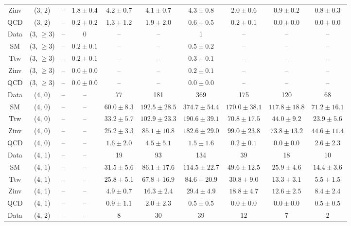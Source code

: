 \begin{table}[h!]
{\begin{tabular}{cccccccccc}
	Zinv & (3, 2) & -- & $1.8\pm 0.4$ & $4.2\pm 0.7$ & $4.1\pm 0.7$ & $4.3\pm 0.8$ & $2.0\pm 0.6$ & $0.9\pm 0.2$ & $0.8\pm 0.3$ \\[0.5ex] 
	QCD & (3, 2) & -- & $0.2\pm 0.2$ & $1.3\pm 1.2$ & $1.9\pm 2.0$ & $0.6\pm 0.5$ & $0.2\pm 0.1$ & $0.0\pm 0.0$ & $0.0\pm 0.0$ \\[0.5ex] 
	Data & (3, $\ge3$) & -- & 0 & -- & -- & 1 & -- & -- & -- \\[0.5ex] 
	SM & (3, $\ge3$) & -- & $0.2\pm 0.1$ & -- & -- & $0.5\pm 0.2$ & -- & -- & -- \\[0.5ex] 
	Ttw & (3, $\ge3$) & -- & $0.2\pm 0.1$ & -- & -- & $0.3\pm 0.1$ & -- & -- & -- \\[0.5ex] 
	Zinv & (3, $\ge3$) & -- & $0.0\pm 0.0$ & -- & -- & $0.2\pm 0.1$ & -- & -- & -- \\[0.5ex] 
	QCD & (3, $\ge3$) & -- & $0.0\pm 0.0$ & -- & -- & $0.0\pm 0.0$ & -- & -- & -- \\[0.5ex] 
	Data & (4, 0) & -- & -- & 77 & 181 & 369 & 175 & 120 & 68 \\[0.5ex] 
	SM & (4, 0) & -- & -- & $60.0\pm 8.3$ & $192.5\pm 28.5$ & $374.7\pm 54.4$ & $170.0\pm 38.1$ & $117.8\pm 18.8$ & $71.2\pm 16.1$ \\[0.5ex] 
	Ttw & (4, 0) & -- & -- & $33.2\pm 5.7$ & $102.9\pm 23.3$ & $190.6\pm 39.1$ & $70.8\pm 17.5$ & $44.0\pm 9.2$ & $23.9\pm 5.6$ \\[0.5ex] 
	Zinv & (4, 0) & -- & -- & $25.2\pm 3.3$ & $85.1\pm 10.8$ & $182.6\pm 29.0$ & $99.0\pm 23.8$ & $73.8\pm 13.2$ & $44.6\pm 11.4$ \\[0.5ex] 
	QCD & (4, 0) & -- & -- & $1.6\pm 2.0$ & $4.5\pm 5.1$ & $1.5\pm 1.6$ & $0.2\pm 0.1$ & $0.0\pm 0.0$ & $2.6\pm 2.3$ \\[0.5ex] 
	Data & (4, 1) & -- & -- & 19 & 93 & 134 & 39 & 18 & 10 \\[0.5ex] 
	SM & (4, 1) & -- & -- & $31.5\pm 5.6$ & $86.1\pm 17.6$ & $114.5\pm 22.7$ & $49.6\pm 12.5$ & $25.9\pm 4.6$ & $14.4\pm 3.6$ \\[0.5ex] 
	Ttw & (4, 1) & -- & -- & $25.8\pm 5.1$ & $67.8\pm 16.9$ & $84.6\pm 20.9$ & $30.8\pm 9.0$ & $13.3\pm 3.1$ & $5.5\pm 1.5$ \\[0.5ex] 
	Zinv & (4, 1) & -- & -- & $4.9\pm 0.7$ & $16.3\pm 2.4$ & $29.4\pm 4.9$ & $18.8\pm 4.7$ & $12.6\pm 2.5$ & $8.4\pm 2.4$ \\[0.5ex] 
	QCD & (4, 1) & -- & -- & $0.9\pm 1.1$ & $2.0\pm 2.3$ & $0.5\pm 0.5$ & $0.0\pm 0.0$ & $0.0\pm 0.0$ & $0.5\pm 0.5$ \\[0.5ex] 
	Data & (4, 2) & -- & -- & 8 & 30 & 39 & 12 & 7 & 2 \\[0.5ex] 

\end{tabular}}
\end{table}

